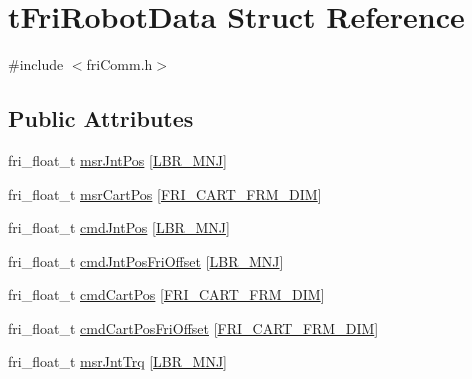 \hypertarget{structtFriRobotData}{\section{t\-Fri\-Robot\-Data \-Struct \-Reference}
\label{structtFriRobotData}
}


{\ttfamily \#include $<$fri\-Comm.\-h$>$}

\subsection*{\-Public \-Attributes}
\begin{DoxyCompactItemize}
\item 
fri\-\_\-float\-\_\-t \hyperlink{structtFriRobotData_ac1bc280d5749a629d8e9e8615c3d37ea}{msr\-Jnt\-Pos} \mbox{[}\hyperlink{friComm_8h_a14d10dff3deb8105d27539540b23ed6e}{\-L\-B\-R\-\_\-\-M\-N\-J}\mbox{]}
\item 
fri\-\_\-float\-\_\-t \hyperlink{structtFriRobotData_ad29ad61ad67d309dbbf0e2dbd67777ff}{msr\-Cart\-Pos} \mbox{[}\hyperlink{friComm_8h_a6a3464c8f97968859a8e68c18a414297}{\-F\-R\-I\-\_\-\-C\-A\-R\-T\-\_\-\-F\-R\-M\-\_\-\-D\-I\-M}\mbox{]}
\item 
fri\-\_\-float\-\_\-t \hyperlink{structtFriRobotData_af4551c91735454c0a474a913381df1a8}{cmd\-Jnt\-Pos} \mbox{[}\hyperlink{friComm_8h_a14d10dff3deb8105d27539540b23ed6e}{\-L\-B\-R\-\_\-\-M\-N\-J}\mbox{]}
\item 
fri\-\_\-float\-\_\-t \hyperlink{structtFriRobotData_ab6f7bb28d6cb8899f360c1bae6d7cc24}{cmd\-Jnt\-Pos\-Fri\-Offset} \mbox{[}\hyperlink{friComm_8h_a14d10dff3deb8105d27539540b23ed6e}{\-L\-B\-R\-\_\-\-M\-N\-J}\mbox{]}
\item 
fri\-\_\-float\-\_\-t \hyperlink{structtFriRobotData_ae6eb0310ed8f76aad695fe7d806f6df7}{cmd\-Cart\-Pos} \mbox{[}\hyperlink{friComm_8h_a6a3464c8f97968859a8e68c18a414297}{\-F\-R\-I\-\_\-\-C\-A\-R\-T\-\_\-\-F\-R\-M\-\_\-\-D\-I\-M}\mbox{]}
\item 
fri\-\_\-float\-\_\-t \hyperlink{structtFriRobotData_a357a2dd3e05e6ba0202961810a716168}{cmd\-Cart\-Pos\-Fri\-Offset} \mbox{[}\hyperlink{friComm_8h_a6a3464c8f97968859a8e68c18a414297}{\-F\-R\-I\-\_\-\-C\-A\-R\-T\-\_\-\-F\-R\-M\-\_\-\-D\-I\-M}\mbox{]}
\item 
fri\-\_\-float\-\_\-t \hyperlink{structtFriRobotData_a117d14548142a3a6586146780b188905}{msr\-Jnt\-Trq} \mbox{[}\hyperlink{friComm_8h_a14d10dff3deb8105d27539540b23ed6e}{\-L\-B\-R\-\_\-\-M\-N\-J}\mbox{]}
\item 

\end{DoxyCompactItemize}

